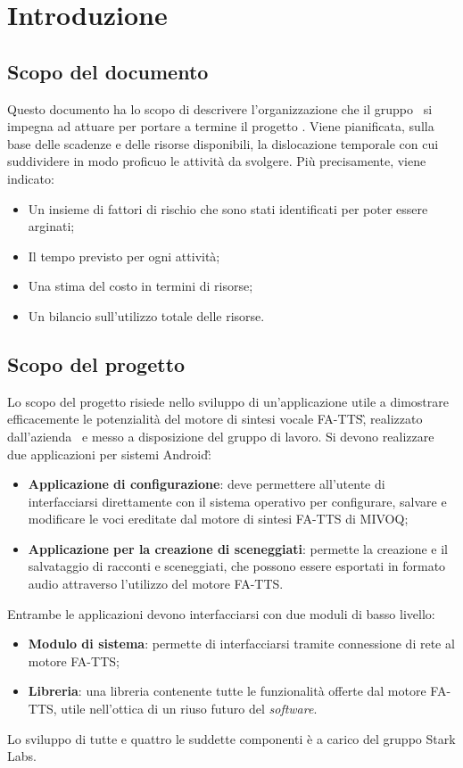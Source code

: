 \section{Introduzione}

\subsection{Scopo del documento}
Questo documento ha lo scopo di descrivere l'organizzazione che il gruppo \GRUPPO\ si impegna ad attuare per portare a termine il progetto \PROGETTO. Viene pianificata, sulla base delle scadenze e delle risorse disponibili, la dislocazione temporale con cui suddividere in modo proficuo le attività da svolgere. Più precisamente, viene indicato:
\begin{itemize}
\item Un insieme di fattori di rischio che sono stati identificati per poter essere arginati;
\item Il tempo previsto per ogni attività;
\item Una stima del costo in termini di risorse;
\item Un bilancio sull'utilizzo totale delle risorse.
\end{itemize}  

\subsection{Scopo del progetto}
Lo scopo del progetto risiede nello sviluppo di un'applicazione utile a dimostrare efficacemente
le potenzialità del motore di sintesi vocale FA-TTS\G, realizzato dall'azienda \AZIENDA\ e messo a disposizione del gruppo di lavoro. Si devono realizzare due applicazioni per sistemi Android\G:
\begin{itemize}
	\item \textbf{Applicazione di configurazione}: deve permettere all'utente di interfacciarsi direttamente con il sistema operativo per configurare, salvare e modificare le voci ereditate dal motore di sintesi FA-TTS di MIVOQ;
	\item \textbf{Applicazione per la creazione di sceneggiati}: permette la creazione e il salvataggio di racconti e sceneggiati, che possono essere esportati in formato audio attraverso l'utilizzo del motore FA-TTS.
\end{itemize}
Entrambe le applicazioni devono interfacciarsi con due moduli di basso livello:
\begin{itemize}
	\item \textbf{Modulo di sistema}: permette di interfacciarsi tramite connessione di rete al motore FA-TTS;
	\item \textbf{Libreria}: una libreria contenente tutte le funzionalità offerte dal motore FA-TTS, utile nell'ottica di un riuso futuro del \textit{software}.
\end{itemize} 
Lo sviluppo di tutte e quattro le suddette componenti è a carico del gruppo Stark Labs.

